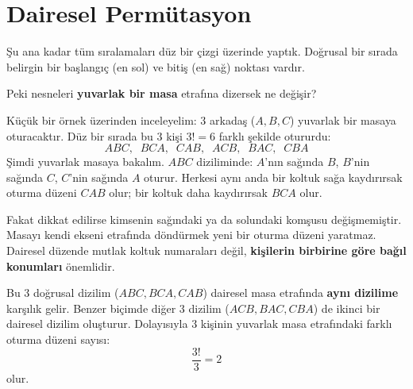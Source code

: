 \section{Dairesel Permütasyon}

Şu ana kadar tüm sıralamaları düz bir çizgi üzerinde yaptık. Doğrusal bir sırada belirgin bir başlangıç (en sol) ve bitiş (en sağ) noktası vardır. 

Peki nesneleri \textbf{yuvarlak bir masa} etrafına dizersek ne değişir?

Küçük bir örnek üzerinden inceleyelim: $3$ arkadaş ($A, B, C$) yuvarlak bir masaya oturacaktır.
Düz bir sırada bu $3$ kişi $3! = 6$ farklı şekilde otururdu:
\[ ABC, \;\; BCA, \;\; CAB, \;\; ACB, \;\; BAC, \;\; CBA \]
Şimdi yuvarlak masaya bakalım. $ABC$ diziliminde:
$A$'nın sağında $B$, $B$'nin sağında $C$, $C$'nin sağında $A$ oturur.
Herkesi aynı anda bir koltuk sağa kaydırırsak oturma düzeni $CAB$ olur; bir koltuk daha kaydırırsak $BCA$ olur. 

Fakat dikkat edilirse kimsenin sağındaki ya da solundaki komşusu değişmemiştir. Masayı kendi ekseni etrafında döndürmek yeni bir oturma düzeni yaratmaz. Dairesel düzende mutlak koltuk numaraları değil, \textbf{kişilerin birbirine göre bağıl konumları} önemlidir.

Bu $3$ doğrusal dizilim ($ABC, BCA, CAB$) dairesel masa etrafında \textbf{aynı dizilime} karşılık gelir.
Benzer biçimde diğer $3$ dizilim ($ACB, BAC, CBA$) de ikinci bir dairesel dizilim oluşturur.
Dolayısıyla $3$ kişinin yuvarlak masa etrafındaki farklı oturma düzeni sayısı:
\[ \frac{3!}{3} = 2 \]
olur.

